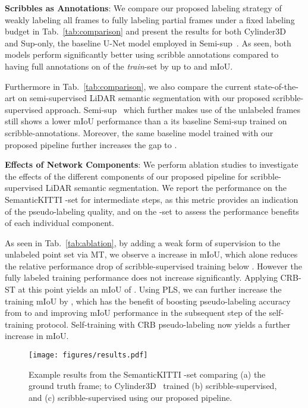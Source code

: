 \documentclass[10pt,twocolumn,letterpaper]{article}
\begin{document}
\noindent \textbf{Scribbles as Annotations}: 
We compare our proposed labeling strategy of weakly labeling all frames to fully labeling partial frames under a fixed labeling budget in Tab.~\ref{tab:comparison} and present the results for both Cylinder3D~\cite{cvpr2021cylindrical} and Sup-only, the baseline U-Net model employed in Semi-sup~\cite{iccv2021guided}. As seen, both models perform significantly better using scribble annotations compared to having full annotations on  of the \textit{train}-set by up to  and  mIoU.

Furthermore in Tab.~\ref{tab:comparison}, we also compare the current state-of-the-art on semi-supervised LiDAR semantic segmentation with our proposed scribble-supervised approach. Semi-sup~\cite{iccv2021guided} which further makes use of the  unlabeled frames still shows a  lower mIoU performance than a its baseline Semi-sup trained on scribble-annotations. Moreover, the same baseline model trained with our proposed pipeline further increases the gap to . 

\noindent \textbf{Effects of Network Components}: We perform ablation studies to investigate the effects of the different components of our proposed pipeline for scribble-supervised LiDAR semantic segmentation. We report the performance on the SemanticKITTI -set for intermediate steps, as this metric provides an indication of the pseudo-labeling quality, and on the -set to assess the performance benefits of each individual component. 

As seen in Tab.~\ref{tab:ablation}, by adding a weak form of supervision to the unlabeled point set via MT, we observe a  increase in mIoU, which alone reduces the relative performance drop of scribble-supervised training below . However the fully labeled training performance does not increase significantly. Applying CRB-ST at this point yields an mIoU of . Using PLS, we can further increase the training mIoU by , which has the benefit of boosting pseudo-labeling accuracy from  to  and improving mIoU performance in the subsequent step of the self-training protocol. Self-training with CRB pseudo-labeling now yields a further  increase in mIoU.

\begin{figure}[t]
    \centering
    \texttt{[image: figures/results.pdf]}
    \caption{Example results from the SemanticKITTI -set comparing (a) the ground truth frame; to Cylinder3D~\cite{cvpr2021cylindrical} trained (b) scribble-supervised, and  (c) scribble-supervised using our proposed pipeline.}
    \label{fig:results}
\vspace{-10px} \end{figure}
\end{document}
